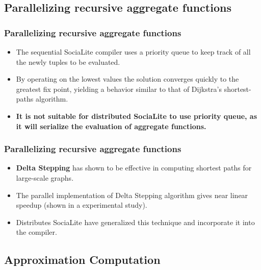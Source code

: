 \documentclass{beamer}
\begin{document}
\subsection{Parallelizing recursive aggregate functions}
\frame
{
	\frametitle{Parallelizing recursive aggregate functions}
	
	\begin{itemize}
		\item The sequential SociaLite compiler uses a priority queue to keep track of all the newly tuples to be evaluated.
		\item By operating on the lowest values the solution converges quickly to the greatest fix point, yielding a behavior similar to that of Dijkstra's shortest-paths algorithm.
		\item \textbf{It is not suitable for distributed SociaLite to use priority queue, as it will serialize the evaluation of aggregate functions.}
	\end{itemize}
	
}

\frame
{
	\frametitle{Parallelizing recursive aggregate functions}
	
	\begin{itemize}
		\item \textbf{Delta Stepping} has shown to be effective in computing shortest paths for large-scale graphs.
		\item The parallel implementation of Delta Stepping algorithm gives near linear speedup (shown in a experimental study).
		\item Distributes SociaLite have generalized this technique and incorporate it into the compiler.
	\end{itemize}

}


\subsection{Approximation Computation}
\end{document}
